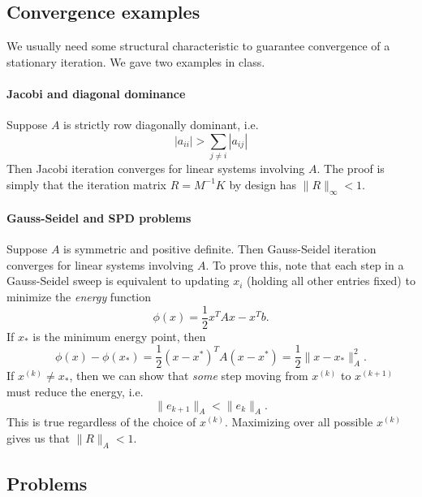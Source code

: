\documentclass[12pt, leqno]{article}
\begin{document}
\subsection{Convergence examples}

We usually need some structural characteristic to guarantee
convergence of a stationary iteration.  We gave two examples
in class.

\paragraph{Jacobi and diagonal dominance}
Suppose $A$ is strictly row diagonally dominant, i.e.
\[
  |a_{ii}| > \sum_{j \neq i} |a_{ij}|
\]
Then Jacobi iteration converges for linear systems involving $A$.
The proof is simply that the iteration matrix $R = M^{-1} K$ by
design has $\|R\|_\infty < 1$.

\paragraph{Gauss-Seidel and SPD problems}
Suppose $A$ is symmetric and positive definite.  Then Gauss-Seidel
iteration converges for linear systems involving $A$.  To prove this,
note that each step in a Gauss-Seidel sweep is equivalent to updating
$x_i$ (holding all other entries fixed) to minimize the {\em energy}
function
\[
  \phi(x) = \frac{1}{2} x^T A x - x^T b.
\]
If $x_*$ is the minimum energy point, then
\[
  \phi(x)-\phi(x_*) = \frac{1}{2} (x-x^*)^T A (x-x^*) = \frac{1}{2} \|x-x_*\|_A^2.
\]
If $x^{(k)} \neq x_*$, then we can show that {\em some} step moving
from $x^{(k)}$ to $x^{(k+1)}$ must reduce the energy, i.e.
\[
  \|e_{k+1}\|_A < \|e_k\|_A.
\]
This is true regardless of the choice of $x^{(k)}$.  Maximizing
over all possible $x^{(k)}$ gives us that $\|R\|_A < 1$.

\subsection{Problems}
\end{document}
